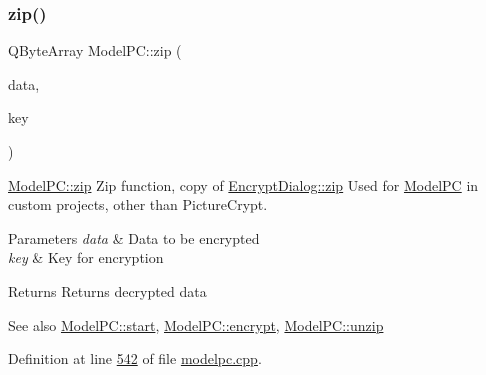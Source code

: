 \subsubsection{\texorpdfstring{zip()}{zip()}}
{\footnotesize\ttfamily Q\+Byte\+Array Model\+P\+C\+::zip (\begin{DoxyParamCaption}\item[{Q\+Byte\+Array}]{data,  }\item[{Q\+Byte\+Array}]{key }\end{DoxyParamCaption})\hspace{0.3cm}{\ttfamily [protected]}}



\mbox{\hyperlink{class_model_p_c_afebbbfa4b07deba4f68fc6dfb50f353f}{Model\+P\+C\+::zip}} Zip function, copy of \mbox{\hyperlink{class_encrypt_dialog_a2bff820a3df4ddc36ecb07ed74b7138a}{Encrypt\+Dialog\+::zip}} Used for \mbox{\hyperlink{class_model_p_c}{Model\+PC}} in custom projects, other than Picture\+Crypt. 


\begin{DoxyParams}{Parameters}
{\em data} & Data to be encrypted \\
\hline
{\em key} & Key for encryption \\
\hline
\end{DoxyParams}
\begin{DoxyReturn}{Returns}
Returns decrypted data 
\end{DoxyReturn}
\begin{DoxySeeAlso}{See also}
\mbox{\hyperlink{class_model_p_c_a3cae34fd5bcb06e8c1f8cfe7961bd270}{Model\+P\+C\+::start}}, \mbox{\hyperlink{class_model_p_c_a8ef76567bc0c0307b4e2547c46536e51}{Model\+P\+C\+::encrypt}}, \mbox{\hyperlink{class_model_p_c_a6da88f166785a49f73b22c169f956fd0}{Model\+P\+C\+::unzip}} 
\end{DoxySeeAlso}


Definition at line \mbox{\hyperlink{modelpc_8cpp_source_l00542}{542}} of file \mbox{\hyperlink{modelpc_8cpp_source}{modelpc.\+cpp}}.

